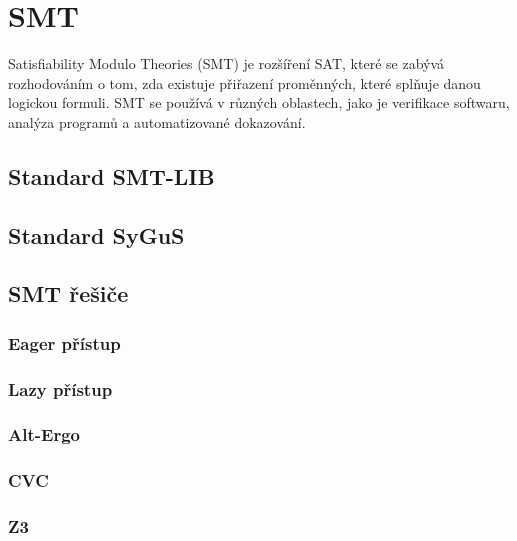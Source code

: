 \chapter{SMT}

Satisfiability Modulo Theories (SMT) je rozšíření SAT, které se zabývá rozhodováním o tom,
zda existuje přiřazení proměnných, které splňuje danou logickou formuli.
SMT se používá v různých oblastech, jako je verifikace softwaru, analýza programů a automatizované dokazování.

\section{Standard SMT-LIB}

\section{Standard SyGuS}

\section{SMT řešiče}
\subsection{Eager přístup}
\subsection{Lazy přístup}
\subsection{Alt-Ergo}
\subsection{CVC}
\subsection{Z3}